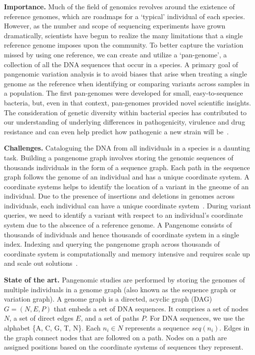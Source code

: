 \noindent
{\bf Importance.}
Much of the field of genomics revolves around the existence of reference genomes, which are roadmaps for a ‘typical’ individual of each species.  However, as the number and scope of sequencing experiments have grown dramatically, scientists have begun to realize the many limitations that a single reference genome imposes upon the community. To better capture the variation missed by using one reference, we can create and utilize a ‘pan-genome’, a collection of all the DNA sequences that occur in a species.
A primary goal of pangenomic variation analysis is to avoid biases that arise when treating a single genome as the reference when identifying or comparing variants across samples in a population.
The first pan-genomes were developed for small, easy-to-sequence bacteria, but, even in that context, pan-genomes provided novel scientific insights. The consideration of genetic diversity within bacterial species has contributed to our understanding of underlying differences in pathogenicity, virulence and drug resistance and can even help predict how pathogenic a new strain will be~\cite{sherman2020pan}.

\noindent
{\bf Challenges.}
Cataloguing the DNA from all individuals in a species is a daunting task.
Building a pangenome graph involves storing the genomic sequences of thousands individuals in the form of a sequence graph. Each path in the sequence graph follows the genome of an individual and has a unique coordinate system. A coordinate systems helps to identify the location of a variant in the gneome of an individual. Due to the presence of insertions and deletions in genomes across individuals, each individual can have a unique coordinate system~\cite{pandey2021variantstore}.
During variant queries, we need to identify a variant with respect to an individual's coordinate system due to the abscence of a reference genome. 
A Pangenome consists of thousands of individuals and hence thousands of coordinate system in a single index. Indexing and querying the pangenome graph across thousands of coordinate system is computationally and memory intensive and requires scale up and scale out solutions~\cite{garrison2018variation,pandey2021variantstore}.

\noindent
{\bf State of the art.}
Pangenomic studies are performed by storing the genomes of multiple individuals in a genome graph (also known as the sequence graph or variation graph). A genome graph is a directed, acyclic graph (DAG) $G = (N, E, P)$ that embeds a set of DNA sequences. It comprises a set of nodes $N$, a set of direct edges $E$, and a set of paths $P$. For DNA sequences, we use the alphabet \{A, C, G, T, N\}\@. Each $n_i \in N$ represents a sequence $seq(n_i)$. Edges in the graph connect nodes that are followed on a path. Nodes on a path are assigned positions based on the coordinate systems of sequences they represent.

